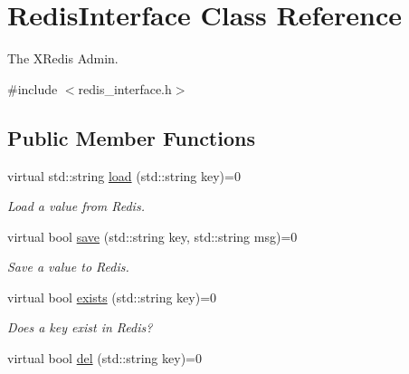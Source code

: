 \hypertarget{classRedisInterface}{\section{Redis\-Interface Class Reference}
\label{classRedisInterface}
}


The X\-Redis Admin.  




{\ttfamily \#include $<$redis\-\_\-interface.\-h$>$}

\subsection*{Public Member Functions}
\begin{DoxyCompactItemize}
\item 
\hypertarget{classRedisInterface_a13dca0045887adbf90dd8f11c007d02d}{virtual std\-::string \hyperlink{classRedisInterface_a13dca0045887adbf90dd8f11c007d02d}{load} (std\-::string key)=0}\label{classRedisInterface_a13dca0045887adbf90dd8f11c007d02d}

\begin{DoxyCompactList}\small\item\em Load a value from Redis. \end{DoxyCompactList}\item 
\hypertarget{classRedisInterface_a60b25df720d353d426567f10a8fca483}{virtual bool \hyperlink{classRedisInterface_a60b25df720d353d426567f10a8fca483}{save} (std\-::string key, std\-::string msg)=0}\label{classRedisInterface_a60b25df720d353d426567f10a8fca483}

\begin{DoxyCompactList}\small\item\em Save a value to Redis. \end{DoxyCompactList}\item 
\hypertarget{classRedisInterface_a1ddea059a6bc0c4503cd98ef520beac0}{virtual bool \hyperlink{classRedisInterface_a1ddea059a6bc0c4503cd98ef520beac0}{exists} (std\-::string key)=0}\label{classRedisInterface_a1ddea059a6bc0c4503cd98ef520beac0}

\begin{DoxyCompactList}\small\item\em Does a key exist in Redis? \end{DoxyCompactList}\item 
\hypertarget{classRedisInterface_a320ec4f76fd83d767dc476a6ca330957}{virtual bool \hyperlink{classRedisInterface_a320ec4f76fd83d767dc476a6ca330957}{del} (std\-::string key)=0}\label{classRedisInterface_a320ec4f76fd83d767dc476a6ca330957}


\end{DoxyCompactItemize}
